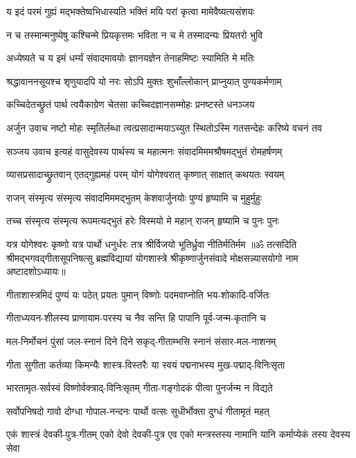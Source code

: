 \twolineshloka
{य इदं परमं गुह्यं मद्भक्तेष्वभिधास्यति}
{भक्तिं मयि परां कृत्वा मामेवैष्यत्यसंशयः}%

\twolineshloka
{न च तस्मान्मनुष्येषु कश्चिन्मे प्रियकृत्तमः}
{भविता न च मे तस्मादन्यः प्रियतरो भुवि}%

\twolineshloka
{अध्येष्यते च य इमं धर्म्यं संवादमावयोः}
{ज्ञानयज्ञेन तेनाहमिष्टः स्यामिति मे मतिः}%

\twolineshloka
{श्रद्धावाननसूयश्च शृणुयादपि यो नरः}
{सोऽपि मुक्तः शुभाँल्लोकान् प्राप्नुयात् पुण्यकर्मणाम्}%

\twolineshloka
{कच्चिदेतच्छ्रुतं पार्थ त्वयैकाग्रेण चेतसा}
{कच्चिदज्ञानसम्मोहः प्रनष्टस्ते धनञ्जय}%

{अर्जुन उवाच}
\twolineshloka
{नष्टो मोहः स्मृतिर्लब्धा त्वत्प्रसादान्मयाऽच्युत}
{स्थितोऽस्मि गतसन्देहः करिष्ये वचनं तव}%

{सञ्जय उवाच}
\twolineshloka
{इत्यहं वासुदेवस्य पार्थस्य च महात्मनः}
{संवादमिममश्रौषमद्भुतं रोमहर्षणम्}%

\twolineshloka
{व्यासप्रसादाच्छ्रुतवान् एतद्गुह्यमहं परम्}
{योगं योगेश्वरात् कृष्णात् साक्षात् कथयतः स्वयम्}%

\twolineshloka
{राजन् संस्मृत्य संस्मृत्य संवादमिममद्भुतम्}
{केशवार्जुनयोः पुण्यं हृष्यामि च मुहुर्मुहुः}%

\twolineshloka
{तच्च संस्मृत्य संस्मृत्य रूपमत्यद्भुतं हरेः}
{विस्मयो मे महान् राजन् हृष्यामि च पुनः पुनः}%

\twolineshloka
{यत्र योगेश्वरः कृष्णो यत्र पार्थो धनुर्धरः}
{तत्र श्रीर्विजयो भूतिर्ध्रुवा नीतिर्मतिर्मम}%
{॥ॐ तत्सदिति श्रीमद्भगवद्गीतासूपनिषत्सु ब्रह्मविद्यायां योगशास्त्रे श्रीकृष्णार्जुनसंवादे मोक्षसन्न्यासयोगो नाम अष्टादशोऽध्यायः॥}

\closesection
\resetShloka
{}
\twolineshloka
{गीताशास्त्रमिदं पुण्यं यः पठेत् प्रयतः पुमान्}
{विष्णोः पदमवाप्नोति भय-शोकादि-वर्जितः}%

\twolineshloka
{गीताध्ययन-शीलस्य प्राणायाम-परस्य च}
{नैव सन्ति हि पापानि पूर्व-जन्म-कृतानि च}%

\twolineshloka
{मल-निर्मोचनं पुंसां जल-स्नानं दिने दिने}
{सकृद्-गीताम्भसि स्नानं संसार-मल-नाशनम्}%

\twolineshloka
{गीता सुगीता कर्तव्या किमन्यैः शास्त्र-विस्तरैः}
{या स्वयं पद्मनाभस्य मुख-पद्माद्-विनिःसृता}%

\twolineshloka
{भारतामृत-सर्वस्वं विष्णोर्वक्त्राद्-विनिःसृतम्}
{गीता-गङ्गोदकं पीत्वा पुनर्जन्म न विद्यते}%

\twolineshloka
{सर्वोपनिषदो गावो दोग्धा गोपाल-नन्दनः}
{पार्थो वत्सः सुधीर्भोक्ता दुग्धं गीतामृतं महत्}%

\fourlineindentedshloka
{एकं शास्त्रं देवकी-पुत्र-गीतम्}
{एको देवो देवकी-पुत्र एव}
{एको मन्त्रस्तस्य नामानि यानि}
{कर्माप्येकं तस्य देवस्य सेवा}%
